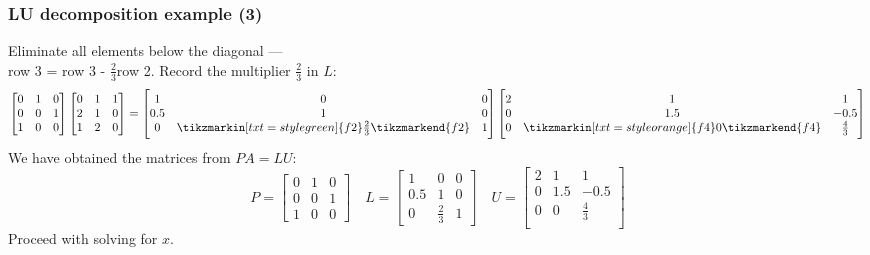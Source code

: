 \documentclass[11pt,table,final,xcolor={usenames,dvipsnames,table}]{beamer}
\begin{document}
\begin{frame}[fragile]
  \frametitle{LU decomposition example (3)}
    Eliminate all elements below the diagonal ---\\
    row 3 = row 3 - $\frac{2}{3}$row 2. Record the multiplier $\frac{2}{3}$ in $L$:
  \[
    \begin{bmatrix}
      0 & 1 & 0\\
      0 & 0 & 1 \\
      1 & 0 & 0
    \end{bmatrix} 
    \begin{bmatrix}
      0 & 1 & 1\\
      2 & 1 & 0\\
      1 & 2 & 0
      \end{bmatrix}= 
      \begin{bmatrix}
      1 & 0 & 0\\
      0.5 & 1 & 0\\
      0 & \tikzmarkin[txt=style green]{f2}\frac{2}{3}\tikzmarkend{f2} & 1
      \end{bmatrix}
      \begin{bmatrix}
      2 & 1 & 1\\
      0 & 1.5 & -0.5 \\
      0 & \tikzmarkin[txt=style orange]{f4}0\tikzmarkend{f4} & \frac{4}{3}\\
      \end{bmatrix}
  \]
  \pause
  We have obtained the matrices from $PA=LU$:
  \[
    P = \begin{bmatrix}
      0 & 1 & 0\\
      0 & 0 & 1 \\
      1 & 0 & 0
    \end{bmatrix} \quad
    L=\begin{bmatrix}
      1 & 0 & 0\\
      0.5 & 1 & 0\\
      0 & \frac{2}{3} & 1
      \end{bmatrix} \quad
      U = \begin{bmatrix}
      2 & 1 & 1\\
      0 & 1.5 & -0.5 \\
      0 & 0 & \frac{4}{3}\\
      \end{bmatrix}
  \]
  Proceed with solving for $x$.
\end{frame}
\end{document}
